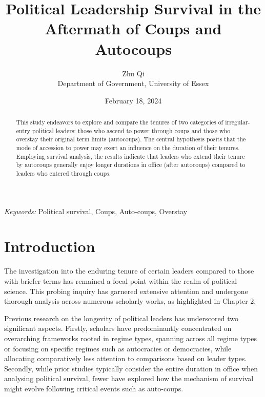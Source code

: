 \documentclass[
  12pt,
  a4paper,
  12pt]{article}
\begin{document}
\def\spacingset#1{\renewcommand{\baselinestretch}%
{#1}\small\normalsize} \spacingset{1}



\date{February 18, 2024}
\title{\bf Political Leadership Survival in the Aftermath of Coups and
Autocoups}
\author{
Zhu Qi\\
Department of Government, University of Essex\\
}
\maketitle

\bigskip
\bigskip
\begin{abstract}
This study endeavors to explore and compare the tenures of two
categories of irregular-entry political leaders: those who ascend to
power through coups and those who overstay their original term limits
(autocoups). The central hypothesis posits that the mode of accession to
power may exert an influence on the duration of their tenures. Employing
survival analysis, the results indicate that leaders who extend their
tenure by autocoups generally enjoy longer durations in office (after
autocoups) compared to leaders who entered through coups.
\end{abstract}

\noindent%
{\it Keywords:} Political survival, Coups, Auto-coups, Overstay
\vfill

\newpage
\spacingset{1.9} %

\section{Introduction}\label{introduction}

The investigation into the enduring tenure of certain leaders compared
to those with briefer terms has remained a focal point within the realm
of political science. This probing inquiry has garnered extensive
attention and undergone thorough analysis across numerous scholarly
works, as highlighted in Chapter 2.

Previous research on the longevity of political leaders has underscored
two significant aspects. Firstly, scholars have predominantly
concentrated on overarching frameworks rooted in regime types, spanning
across all regime types or focusing on specific regimes such as
autocracies or democracies, while allocating comparatively less
attention to comparisons based on leader types. Secondly, while prior
studies typically consider the entire duration in office when analysing
political survival, fewer have explored how the mechanism of survival
might evolve following critical events such as auto-coups.
\end{document}
